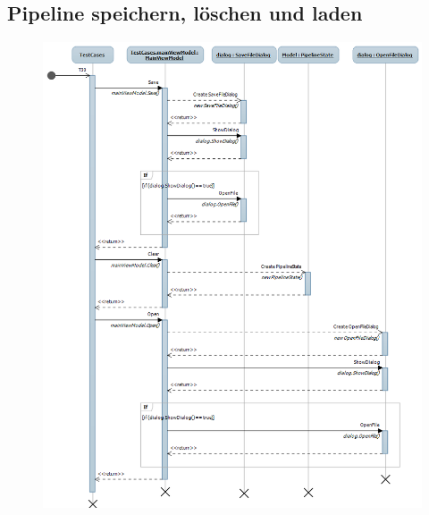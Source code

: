 \subsection{Pipeline speichern, löschen und laden}
\begin{figure}[h!]
\begin{center}
\includegraphics[width=\textwidth]{Diagrams/SaveClearLoad.png}
\end{center}
\end{figure}
\newpage

